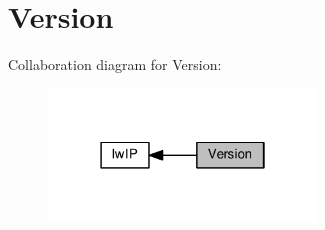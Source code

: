 \hypertarget{group__lwip__version}{}\section{Version}
\label{group__lwip__version}
Collaboration diagram for Version\+:
\nopagebreak
\begin{figure}[H]
\begin{center}
\leavevmode
\includegraphics[width=202pt]{group__lwip__version}
\end{center}
\end{figure}
